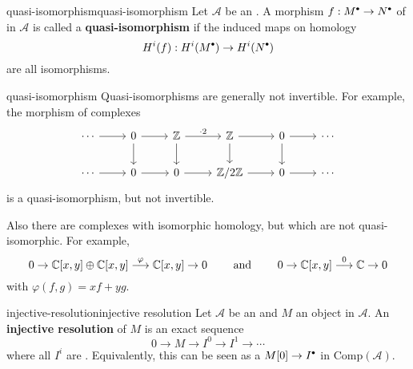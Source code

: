 \begin{topic}{quasi-isomorphism}{quasi-isomorphism}
    Let $\mathcal{A}$ be an . A morphism $f : M^\bdot \to N^\bdot$ of  in $\mathcal{A}$ is called a \textbf{quasi-isomorphism} if the induced maps on homology
    \[ H^i(f) : H^i(M^\bdot) \to H^i(N^\bdot) \]
    are all isomorphisms.
\end{topic}

\begin{example}{quasi-isomorphism}
    Quasi-isomorphisms are generally not invertible. For example, the morphism of complexes
    \[ \begin{tikzcd} \cdots \arrow{r} & 0 \arrow{d} \arrow{r} & \ZZ \arrow{r}{\cdot 2} \arrow{d} & \ZZ \arrow{r} \arrow{d} & 0 \arrow{r} \arrow{d} & \cdots \\ \cdots \arrow{r} & 0 \arrow{r} & 0 \arrow{r} & \ZZ/2\ZZ \arrow{r} & 0 \arrow{r} & \cdots  \end{tikzcd} \]
    is a quasi-isomorphism, but not invertible.
    
    Also there are complexes with isomorphic homology, but which are not quasi-isomorphic. For example,
    \[ 0 \to \mathbb{C}[x, y] \oplus \mathbb{C}[x, y] \overset{\varphi}{\longrightarrow} \mathbb{C}[x, y] \to 0 \qquad \text{ and } \qquad 0 \to \mathbb{C}[x, y] \overset{0}{\longrightarrow} \mathbb{C} \to 0 \]
    with $\varphi(f, g) = xf + yg$.
\end{example}

\begin{topic}{injective-resolution}{injective resolution}
    Let $\mathcal{A}$ be an  and $M$ an object in $\mathcal{A}$. An \textbf{injective resolution} of $M$ is an exact sequence
    \[ 0 \to M \to I^0 \to I^1 \to \cdots \]
    where all $I^i$ are . Equivalently, this can be seen as a  $M[0] \to I^\bdot$ in $\text{Comp}(\mathcal{A})$.
\end{topic}

